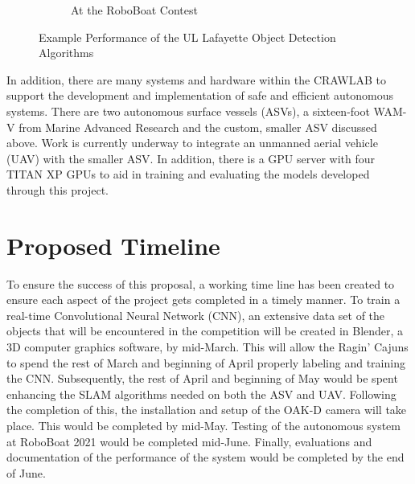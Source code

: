 \documentclass[12 pt]{article}
\begin{document}
\begin{figure}[tb]
\begin{subfigure}{0.48\columnwidth}
    \caption{At the RoboBoat Contest}
    \label{fig:RoboBoat_example}
    \end{subfigure}
\caption{Example Performance of the UL Lafayette Object Detection Algorithms} %
\label{fig:detection_examples}	%
\end{figure}
%

In addition, there are many systems and hardware within the CRAWLAB to support the development and implementation of safe and efficient autonomous systems. There are two autonomous surface vessels (ASVs), a sixteen-foot WAM-V from Marine Advanced Research and the custom, smaller ASV discussed above. Work is currently underway to integrate an unmanned aerial vehicle (UAV) with the smaller ASV. In addition, there is a GPU server with four TITAN XP GPUs to aid in training and evaluating the models developed through this project.


\section{Proposed Timeline}
\label{sec:timeline}
\vspace{-0.2in}
%
To ensure the success of this proposal, a working time line has been created to ensure each aspect of the project gets completed in a timely manner. To train a real-time Convolutional Neural Network (CNN), an extensive data set of the objects that will be encountered in the competition will be created in Blender, a 3D computer graphics software, by mid-March. This will allow the Ragin' Cajuns to spend the rest of March and beginning of April properly labeling and training the CNN. Subsequently, the rest of April and beginning of May would be spent enhancing the SLAM algorithms needed on both the ASV and UAV. Following the completion of this, the installation and setup of the OAK-D camera will take place. This would be completed by mid-May. Testing of the autonomous system at RoboBoat 2021 would be completed mid-June. Finally, evaluations and documentation of the performance of the system would be completed by the end of June. 

\end{document}
